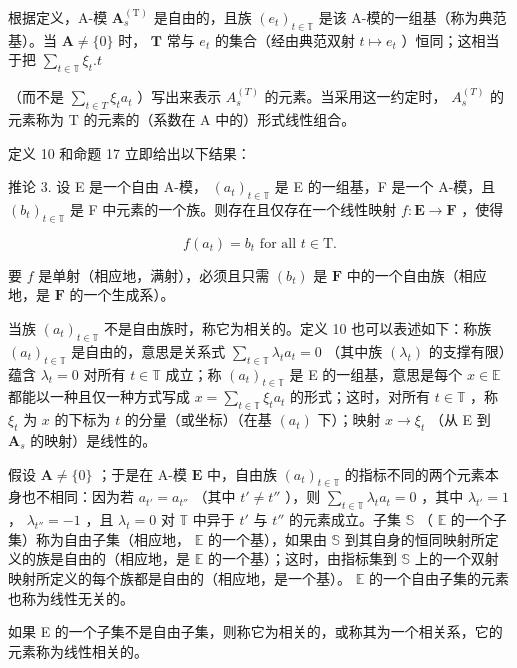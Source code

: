 根据定义，A-模 \(\mathbf{A}_s^{(\mathrm{T})}\) 是自由的，且族 \((e_t)_{t\in \mathbb{T}}\) 是该 A-模的一组基（称为典范基）。当 \(\mathbf{A}\neq \{0\}\) 时， \(\mathbf{T}\) 常与 \(e_t\) 的集合（经由典范双射 \(t\mapsto e_t\) ）恒同；这相当于把 \(\sum_{t\in \mathbb{T}}\xi_t.t\)

（而不是 \(\sum_{t\in T}\xi_{t}a_{t}\) ）写出来表示 \(A_{s}^{(T)}\) 的元素。当采用这一约定时， \(A_{s}^{(T)}\) 的元素称为 T 的元素的（系数在 A 中的）形式线性组合。

定义 10 和命题 17 立即给出以下结果：

推论 3. 设 E 是一个自由 A-模， \((a_{t})_{t\in \mathbb{T}}\) 是 E 的一组基，F 是一个 A-模，且 \((b_{t})_{t\in \mathbb{T}}\) 是 F 中元素的一个族。则存在且仅存在一个线性映射 \(f:\mathbf{E}\to \mathbf{F}\) ，使得

\[
f (a _ {t}) = b _ {t} \text {   for   all   } t \in \mathrm{T}.\tag{45}
\]

要 \(f\) 是单射（相应地，满射），必须且只需 \((b_t)\) 是 \(\mathbf{F}\) 中的一个自由族（相应地，是 \(\mathbf{F}\) 的一个生成系）。

当族 \((a_{t})_{t\in \mathbb{T}}\) 不是自由族时，称它为相关的。定义 10 也可以表述如下：称族 \((a_{t})_{t\in \mathbb{T}}\) 是自由的，意思是关系式 \(\sum_{t\in \mathbb{T}}\lambda_t a_t = 0\) （其中族 \((\lambda_t)\) 的支撑有限）蕴含 \(\lambda_{t} = 0\) 对所有 \(t\in \mathbb{T}\) 成立；称 \((a_{t})_{t\in \mathbb{T}}\) 是 E 的一组基，意思是每个 \(x\in \mathbb{E}\) 都能以一种且仅一种方式写成 \(x = \sum_{t\in \mathbb{T}}\xi_t a_t\) 的形式；这时，对所有 \(t\in \mathbb{T}\) ，称 \(\xi_{t}\) 为 \(x\) 的下标为 \(t\) 的分量（或坐标）（在基 \((a_{t})\) 下）；映射 \(x\to \xi_t\) （从 E 到 \(\mathbf{A}_s\) 的映射）是线性的。

假设 \(\mathbf{A} \neq \{0\}\) ；于是在 A-模 \(\mathbf{E}\) 中，自由族 \((a_t)_{t \in \mathbb{T}}\) 的指标不同的两个元素本身也不相同：因为若 \(a_{t'} = a_{t''}\) （其中 \(t' \neq t''\) ），则 \(\sum_{t \in \mathbb{T}} \lambda_t a_t = 0\) ，其中 \(\lambda_{t'} = 1\) ， \(\lambda_{t''} = -1\) ，且 \(\lambda_t = 0\) 对 \(\mathbb{T}\) 中异于 \(t'\) 与 \(t''\) 的元素成立。子集 \(\mathbb{S}\) （ \(\mathbb{E}\) 的一个子集）称为自由子集（相应地， \(\mathbb{E}\) 的一个基），如果由 \(\mathbb{S}\) 到其自身的恒同映射所定义的族是自由的（相应地，是 \(\mathbb{E}\) 的一个基）；这时，由指标集到 \(\mathbb{S}\) 上的一个双射映射所定义的每个族都是自由的（相应地，是一个基）。 \(\mathbb{E}\) 的一个自由子集的元素也称为线性无关的。

如果 E 的一个子集不是自由子集，则称它为相关的，或称其为一个相关系，它的元素称为线性相关的。

